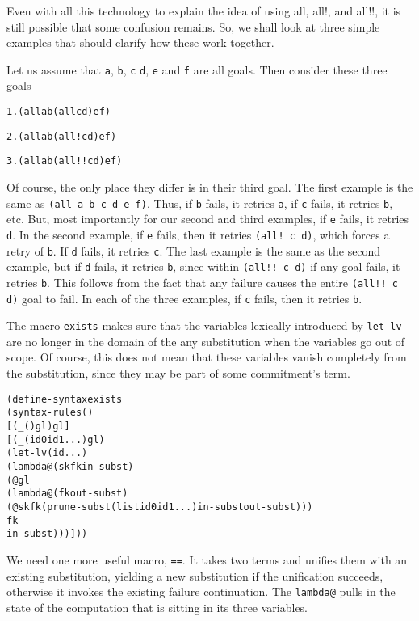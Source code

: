 Even with all this technology to explain the idea of using all, all!,
and all!!, it is still possible that some confusion remains.  So, we
shall look at three simple examples that should clarify how these
work together.

Let us assume that \texttt{a}, \texttt{b}, \texttt{c} \texttt{d},
\texttt{e} and \texttt{f} are all goals.  Then consider these
three goals

\begin{alltt}
1. (all a b (all c d) e f)

2. (all a b (all! c d) e f)

3. (all a b (all!! c d) e f)
\end{alltt}

Of course, the only place they differ is in their third goal.
The first example is the same as \texttt{(all a b c d e f)}.  Thus, if
\texttt{b} fails, it retries \texttt{a}, if \texttt{c} fails, it
retries \texttt{b}, etc. But, most importantly for our second and
third examples, if \texttt{e} fails, it retries \texttt{d}.  In the
second example, if \texttt{e} fails, then it retries \texttt{(all! c
d)}, which forces a retry of \texttt{b}.  If \texttt{d} fails, it
retries \texttt{c}.  The last example is the same as the second
example, but if \texttt{d} fails, it retries \texttt{b}, since within
\texttt{(all!! c d)} if any goal fails, it retries \texttt{b}.
This follows from the fact that any failure causes the entire
\texttt{(all!! c d)} goal to fail.  In each of the three
examples, if \texttt{c} fails, then it retries \texttt{b}.

The macro \texttt{exists} makes sure that the variables
lexically introduced by \texttt{let-lv} are no longer in the
domain of the any substitution when the variables go out of scope.
Of course, this does not mean that these variables vanish completely
from the substitution, since they may be part of some commitment's term.

\begin{alltt}
(define-syntax exists
  (syntax-rules ()
    [(_ () gl) gl]
    [(_ (id0 id1 ...) gl)
     (let-lv (id ...)
       (lambda@ (sk fk in-subst)
	 (@ gl
            (lambda@ (fk out-subst)
              (@ sk fk (prune-subst (list id0 id1 ...) in-subst out-subst)))
            fk
            in-subst)))]))
\end{alltt}

We need one more useful macro, \texttt{==}.  It takes two terms and
unifies them with an existing substitution, yielding a new
substitution if the unification succeeds, otherwise it invokes the
existing failure continuation.  The \texttt{lambda@} pulls in the
state of the computation that is sitting in its three variables.

